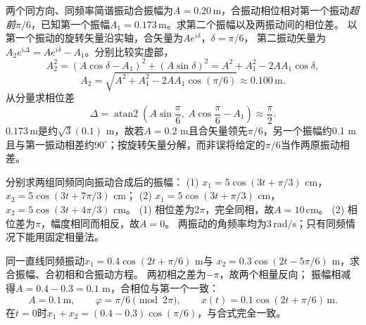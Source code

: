 \problemtext 两个同方向、同频率简谐振动合振幅为$A=0.20\,\mathrm m$，合振动相位相对第一个振动\emph{超前}$\pi/6$，已知第一个振幅$A_1=0.173\,\mathrm m$。求第二个振幅以及两振动间的相位差。
\workings
以第一个振动的旋转矢量沿实轴，合矢量为$A e^{i\delta}$，$\delta=\pi/6$，
第二振动矢量为$A_2e^{i\Delta}=Ae^{i\delta}-A_1$。分别比较实虚部，
\[
A_2^2=(A\cos\delta-A_1)^2+(A\sin\delta)^2
=A^2+A_1^2-2AA_1\cos\delta,
\]
\[
\boxed{A_2=\sqrt{A^2+A_1^2-2AA_1\cos(\pi/6)}
\approx0.100\,\mathrm m}.
\]
从分量求相位差
\[
\boxed{\Delta=\operatorname{atan2}
\left(A\sin\frac\pi6,\ A\cos\frac\pi6-A_1\right)
\approx\frac{\pi}{2}}.
\]
\crosscheck $0.173\,\mathrm m$是约$\sqrt3(0.1)$ m，故若$A=0.2$ m且合矢量领先$\pi/6$，另一个振幅约0.1 m且与第一振动相差约$90^\circ$；按旋转矢量分解，而非误将给定的$\pi/6$当作两原振动相差。

\problemtext 分别求两组同频同向振动合成后的振幅：
(1) $x_1=5\cos(3t+\pi/3)$ cm，$x_2=5\cos(3t+7\pi/3)$ cm；
(2) $x_1=5\cos(3t+\pi/3)$ cm，$x_2=5\cos(3t+4\pi/3)$ cm。
\workings
(1) 相位差为$2\pi$，完全同相，故$\boxed{A=10\,\mathrm{cm}}$。
(2) 相位差为$\pi$，幅度相同而相反，故$\boxed{A=0}$。
\crosscheck 两振动的角频率均为$3\,\mathrm{rad/s}$；只有同频情况下能用固定相量法。

\problemtext 同一直线同频振动$x_1=0.4\cos(2t+\pi/6)$ m与
$x_2=0.3\cos(2t-5\pi/6)$ m，求合振幅、合初相和合振动方程。
\workings
两初相之差为$-\pi$，故两个相量反向；
振幅相减得$A=0.4-0.3=0.1$ m，合相位与第一个一致：
\[
\boxed{A=0.1\,\mathrm m},\qquad
\boxed{\varphi=\pi/6\pmod{2\pi}},\qquad
\boxed{x(t)=0.1\cos(2t+\pi/6)\,\mathrm m}.
\]
\crosscheck 在$t=0$时$x_1+x_2=(0.4-0.3)\cos(\pi/6)$，与合式完全一致。
